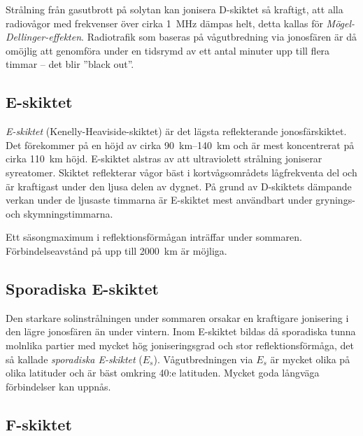 Strålning från gasutbrott på solytan kan jonisera D-skiktet så kraftigt, att
alla radiovågor med frekvenser över cirka \SI{1}{\mega\hertz} dämpas helt,
detta kallas för \emph{Mögel-Dellinger-effekten}.
Radiotrafik som baseras på vågutbredning via jonosfären är då
omöjlig att genomföra under en tidsrymd av ett antal minuter upp till
flera timmar -- det blir ''black out''.

\subsection{E-skiktet}
\label{e-skiktet}

\emph{E-skiktet} (Kenelly-Heaviside-skiktet) är det lägsta reflekterande
jonosfärskiktet.
Det förekommer på en höjd av cirka \SIrange{90}{140}{\kilo\metre} och är mest
koncentrerat på cirka \SI{110}{\kilo\metre} höjd.
E-skiktet alstras av att ultraviolett strålning joniserar syreatomer.
Skiktet reflekterar vågor bäst i kortvågsområdets lågfrekventa del och är
kraftigast under den ljusa delen av dygnet.
På grund av D-skiktets dämpande verkan under de ljusaste timmarna är E-skiktet
mest användbart under grynings- och skymningstimmarna.

Ett säsongmaximum i reflektionsförmågan inträffar under sommaren.
Förbindelseavstånd på upp till \SI{2000}{\kilo\metre} är möjliga.

\subsection{Sporadiska E-skiktet}
\label{sporadiskt_e}

Den starkare solinstrålningen under sommaren orsakar en kraftigare
jonisering i den lägre jonosfären än under vintern.
Inom E-skiktet bildas då sporadiska tunna molnlika partier med mycket hög
joniseringsgrad och stor reflektionsförmåga, det så kallade \emph{sporadiska
E-skiktet} (\(E_s\)).
Vågutbredningen via \(E_s\) är mycket olika på olika latituder och är bäst
omkring 40:e latituden.
Mycket goda långväga förbindelser kan uppnås.


\subsection{F-skiktet}

